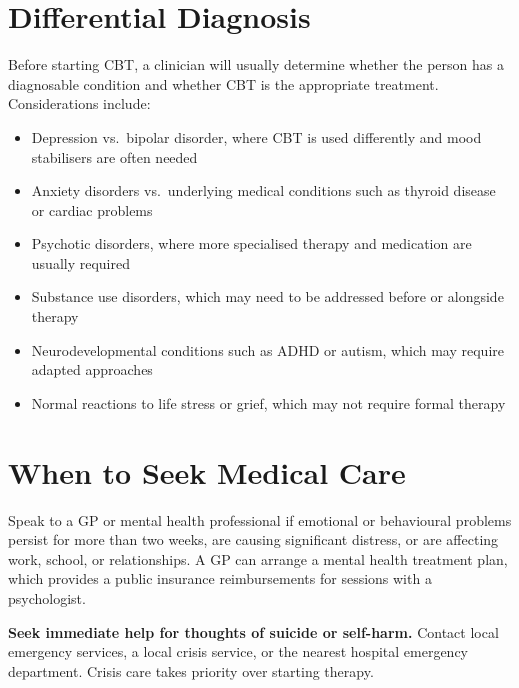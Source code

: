 \section*{Differential Diagnosis}
Before starting CBT, a clinician will usually determine whether the person has a diagnosable condition and whether CBT is the appropriate treatment. Considerations include:

\begin{itemize}
    \item Depression vs.\ bipolar disorder, where CBT is used differently and mood stabilisers are often needed
    \item Anxiety disorders vs.\ underlying medical conditions such as thyroid disease or cardiac problems
    \item Psychotic disorders, where more specialised therapy and medication are usually required
    \item Substance use disorders, which may need to be addressed before or alongside therapy
    \item Neurodevelopmental conditions such as ADHD or autism, which may require adapted approaches
    \item Normal reactions to life stress or grief, which may not require formal therapy
\end{itemize}

\section*{When to Seek Medical Care}
Speak to a GP or mental health professional if emotional or behavioural problems persist for more than two weeks, are causing significant distress, or are affecting work, school, or relationships. A GP can arrange a mental health treatment plan, which provides a public insurance reimbursements for sessions with a psychologist.

\textbf{Seek immediate help for thoughts of suicide or self-harm.} Contact local emergency services, a local crisis service, or the nearest hospital emergency department. Crisis care takes priority over starting therapy.

